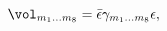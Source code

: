 \begin{equation}
\label{d8vol}
   \vol_{m_1\dots m_8} = \bar{\epsilon}\gamma_{m_1\dots m_8}\epsilon ,
\end{equation}

